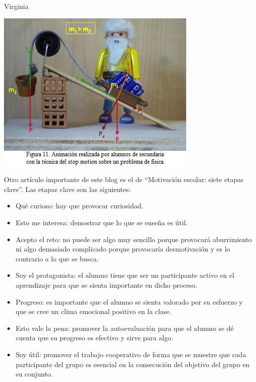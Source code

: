 \begin{opin}{\virgicolor}{Virginia}
\begin{minipage}[hbtp]{1.0\linewidth}
\centering
\includegraphics[scale=0.8]{img/playmovil.jpg}
\label{playmovil}
\end{minipage}


Otro artículo importante de este blog es el de “Motivación escolar: siete etapas clave”. Las etapas clave son las siguientes:

\begin{itemize}

\item Qué curioso: hay que provocar curiosidad. 

\item Esto me interesa: demostrar que lo que se enseña es útil. 

\item Acepto el reto: no puede ser algo muy sencillo porque provocará aburrimiento ni algo demasiado complicado porque provocaría desmotivación y es lo contrario a lo que se busca. 

\item Soy el protagonista: el alumno tiene que ser un participante activo en el aprendizaje para que se sienta importante en dicho proceso. 

\item Progreso: es importante que el alumno se sienta valorado por su esfuerzo y que se cree un clima emocional positivo en la clase. 

\item Esto vale la pena: promover la autoevaluación para que el alumno se dé cuenta que su progreso es efectivo y sirve para algo. 

\item Soy útil: promover el trabajo cooperativo de forma que se muestre que cada participante del grupo es esencial en la consecución del objetivo del grupo en su conjunto. 
\end{itemize}

\end{opin}
